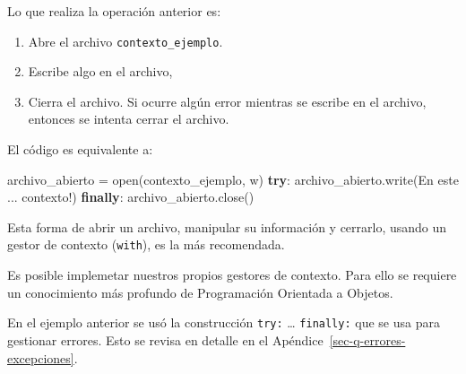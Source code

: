 \documentclass[
  spanish,
  letterpaper,
]{scrbook}
\newenvironment{Shaded}{\begin{snugshade}}{\end{snugshade}}
\newcommand{\BuiltInTok}[1]{\textcolor[rgb]{0.00,0.23,0.31}{#1}}
\newcommand{\ControlFlowTok}[1]{\textcolor[rgb]{0.00,0.23,0.31}{\textbf{#1}}}
\newcommand{\NormalTok}[1]{\textcolor[rgb]{0.00,0.23,0.31}{#1}}
\newcommand{\OperatorTok}[1]{\textcolor[rgb]{0.37,0.37,0.37}{#1}}
\newcommand{\StringTok}[1]{\textcolor[rgb]{0.13,0.47,0.30}{#1}}
\providecommand{\tightlist}{%
  \setlength{\itemsep}{0pt}\setlength{\parskip}{0pt}}
\theoremstyle{definition}
\theoremstyle{remark}
\begin{document}
Lo que realiza la operación anterior es:

\begin{enumerate}
\def\labelenumi{\arabic{enumi}.}
\tightlist
\item
  Abre el archivo \texttt{contexto\_ejemplo}.
\item
  Escribe algo en el archivo,
\item
  Cierra el archivo. Si ocurre algún error mientras se escribe en el
  archivo, entonces se intenta cerrar el archivo.
\end{enumerate}

El código es equivalente a:

\begin{Shaded}
\begin{Highlighting}[]
\NormalTok{archivo\_abierto }\OperatorTok{=} \BuiltInTok{open}\NormalTok{(}\StringTok{\textquotesingle{}contexto\_ejemplo\textquotesingle{}}\NormalTok{, }\StringTok{\textquotesingle{}w\textquotesingle{}}\NormalTok{)}
\ControlFlowTok{try}\NormalTok{:}
\NormalTok{    archivo\_abierto.write(}\StringTok{\textquotesingle{}En este ... contexto!\textquotesingle{}}\NormalTok{)}
\ControlFlowTok{finally}\NormalTok{:}
\NormalTok{    archivo\_abierto.close()}
\end{Highlighting}
\end{Shaded}

\begin{tcolorbox}[enhanced jigsaw, colframe=quarto-callout-tip-color-frame, opacityback=0, toprule=.15mm, colback=white, coltitle=black, leftrule=.75mm, arc=.35mm, breakable, left=2mm, bottomtitle=1mm, rightrule=.15mm, bottomrule=.15mm, colbacktitle=quarto-callout-tip-color!10!white, toptitle=1mm, titlerule=0mm, opacitybacktitle=0.6, title=\textcolor{quarto-callout-tip-color}{\faLightbulb}\hspace{0.5em}{Tip}]

Esta forma de abrir un archivo, manipular su información y cerrarlo,
usando un gestor de contexto (\texttt{with}), es la más recomendada.

\end{tcolorbox}

Es posible implemetar nuestros propios gestores de contexto. Para ello
se requiere un conocimiento más profundo de Programación Orientada a
Objetos.

\begin{tcolorbox}[enhanced jigsaw, colframe=quarto-callout-note-color-frame, opacityback=0, toprule=.15mm, colback=white, coltitle=black, leftrule=.75mm, arc=.35mm, breakable, left=2mm, bottomtitle=1mm, rightrule=.15mm, bottomrule=.15mm, colbacktitle=quarto-callout-note-color!10!white, toptitle=1mm, titlerule=0mm, opacitybacktitle=0.6, title=\textcolor{quarto-callout-note-color}{\faInfo}\hspace{0.5em}{Nota.}]

En el ejemplo anterior se usó la construcción \texttt{try:} \ldots{}
\texttt{finally:} que se usa para gestionar errores. Esto se revisa en
detalle en el Apéndice~\ref{sec-q-errores-excepciones}.

\end{tcolorbox}
\end{document}

